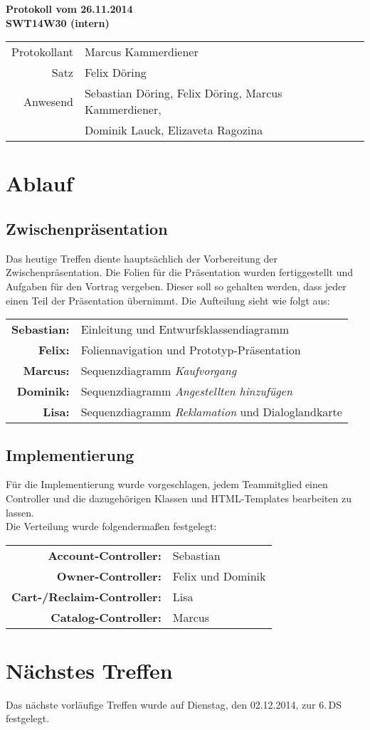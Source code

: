 \documentclass{scrartcl}
\begin{document}
\begin{center}
\LARGE \bf{Protokoll vom 26.11.2014 \\
SWT14W30 (intern)}
\end{center}

\begin{tabular}{rp{10cm}}
Protokollant & Marcus Kammerdiener \\
Satz & Felix Döring \\
Anwesend & Sebastian Döring, Felix Döring, Marcus Kammerdiener,\\
& Dominik Lauck, Elizaveta Ragozina \\
\end{tabular}

\vspace*{3em}

\section{Ablauf}
\subsection{Zwischenpräsentation}
Das heutige Treffen diente hauptsächlich der Vorbereitung der Zwischenpräsentation. \linebreak
Die Folien für die Präsentation wurden fertiggestellt und Aufgaben für den Vortrag vergeben. Dieser soll so gehalten werden, dass jeder einen Teil der Präsentation übernimmt. \linebreak
Die Aufteilung sieht wie folgt aus:\\[.5cm]
\begin{tabular}{rp{10cm}}
\textbf{Sebastian:} & Einleitung und Entwurfsklassendiagramm\\
\textbf{Felix:} & Foliennavigation und Prototyp-Präsentation\\
\textbf{Marcus:} & Sequenzdiagramm \textit{Kaufvorgang}\\
\textbf{Dominik:} & Sequenzdiagramm \textit{Angestellten hinzufügen}\\
\textbf{Lisa:} & Sequenzdiagramm \textit{Reklamation} und Dialoglandkarte\\
\end{tabular}
\subsection{Implementierung}
Für die Implementierung wurde vorgeschlagen, jedem Teammitglied einen Controller und die dazugehörigen Klassen und HTML-Templates bearbeiten zu lassen. \\
Die Verteilung wurde folgendermaßen festgelegt: \\[.5cm]
\begin{tabular}{rp{10cm}}
\textbf{Account-Controller:} & Sebastian\\
\textbf{Owner-Controller:} & Felix und Dominik\\
\textbf{Cart-/Reclaim-Controller:} & Lisa\\
\textbf{Catalog-Controller:} & Marcus\\
\end{tabular}
\vspace*{1em}

\section{N\"achstes Treffen}
Das nächste vorläufige Treffen wurde auf Dienstag, den 02.12.2014, zur 6.\,DS festgelegt.
\end{document}
